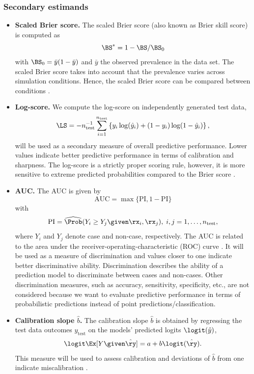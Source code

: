 \begin{subappendices}
\subsubsection{Secondary estimands}
\begin{itemize}
  \item \textbf{Scaled Brier score.} The scaled Brier score (also known as Brier
        skill score) is computed as
  $$\BS^{*} = 1 - \BS/\BS_{0}$$
        with $\BS_{0} = \bar{y}(1 - \bar{y})$ and $\bar{y}$ the observed
        prevalence in the data set. The scaled Brier score takes into account
        that the prevalence varies across simulation conditions. Hence, the
        scaled Brier score can be compared between conditions \citep{Schmid2005,
        Steyerberg2019}.

  \item \textbf{Log-score.} We compute the log-score on independently generated test data,
  $$\LS = - n_{\text{test}}^{-1} \sum_{i=1}^{n_{\text{test}}} \left\{ y_{i} \log(\hat{y}_{i})
        + (1 - y_{i}) \log (1 - \hat{y}_{i})\right\},$$ will be used as a
        secondary measure of overall predictive performance. Lower values
        indicate better predictive performance in terms of calibration and
        sharpness. The log-score is a strictly proper scoring rule, however, it
        is more sensitive to extreme predicted probabilities compared to the
        Brier score \citep{Gneiting2007}.

  \item \textbf{AUC.} The AUC is given by
  $$\text{AUC} = \max\{\text{PI}, 1 - \text{PI}\}$$
        with $$\text{PI} = \widehat\Prob(Y_i \geq Y_j \given \rx_i, \rx_j), \; i,j = 1, \dots, n_{\text{test}},$$
        where $Y_i$ and $Y_j$ denote case and non-case, respectively. The AUC is
        related to the area under the receiver-operating-characteristic (ROC)
        curve \citep{Steyerberg2019}. It will be used as a measure of
        discrimination and values closer to one indicate better discriminative
        ability. Discrimination describes the ability of a prediction model to
        discriminate between cases and non-cases. Other discrimination measures,
        such as accuracy, sensitivity, specificity, etc., are not considered
        because we want to evaluate predictive performance in terms of
        probabilistic predictions instead of point predictions/classification.

  \item \textbf{Calibration slope $\hat b$.} The calibration slope $\hat b$ is
        obtained by regressing the test data outcomes $y_{\text{test}}$ on the
        models' predicted logits $\logit({\hat{y}})$, \ie
  $$\logit\Ex[Y \given \hat\ry] = a + b\logit(\hat\ry).$$
        This measure will be used to assess calibration and deviations of
        $\hat b$ from one indicate miscalibration \citep{Steyerberg2019}.


\end{itemize}
\end{subappendices}
